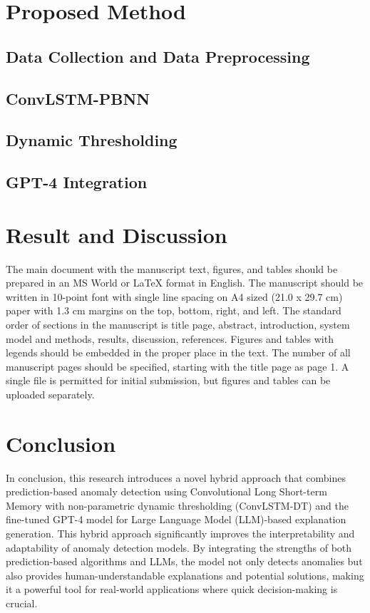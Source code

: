 \documentclass[final,3p,times,twocolumn]{elsarticle}
\begin{document}
\section{Proposed Method}\label{sec2}

\subsection{Data Collection and Data Preprocessing}
\subsection{ConvLSTM-PBNN}
\subsection{Dynamic Thresholding}
\subsection{GPT-4 Integration}


\section{Result and Discussion}\label{sec3}

The main document with the manuscript text, figures, and tables should be prepared in an MS World or LaTeX format in English. 
The manuscript should be written in 10-point font with single line spacing on A4 sized (21.0 x 29.7 cm) paper with 1.3 cm margins on the top, bottom, right, and left. 
The standard order of sections in the manuscript is title page, abstract, introduction, system model and methods, results, discussion, references. 
Figures and tables with legends should be embedded in the proper place in the text. 
The number of all manuscript pages should be specified, starting with the title page as page 1. A single file is permitted for initial submission, but figures and tables can be uploaded separately.

\section{Conclusion}\label{sec4}
In conclusion, this research introduces a novel hybrid approach that combines prediction-based anomaly detection using Convolutional Long Short-term Memory with non-parametric dynamic thresholding (ConvLSTM-DT) and the fine-tuned GPT-4 model for Large Language Model (LLM)-based explanation generation. This hybrid approach significantly improves the interpretability and adaptability of anomaly detection models. By integrating the strengths of both prediction-based algorithms and LLMs, the model not only detects anomalies but also provides human-understandable explanations and potential solutions, making it a powerful tool for real-world applications where quick decision-making is crucial.
\end{document}
